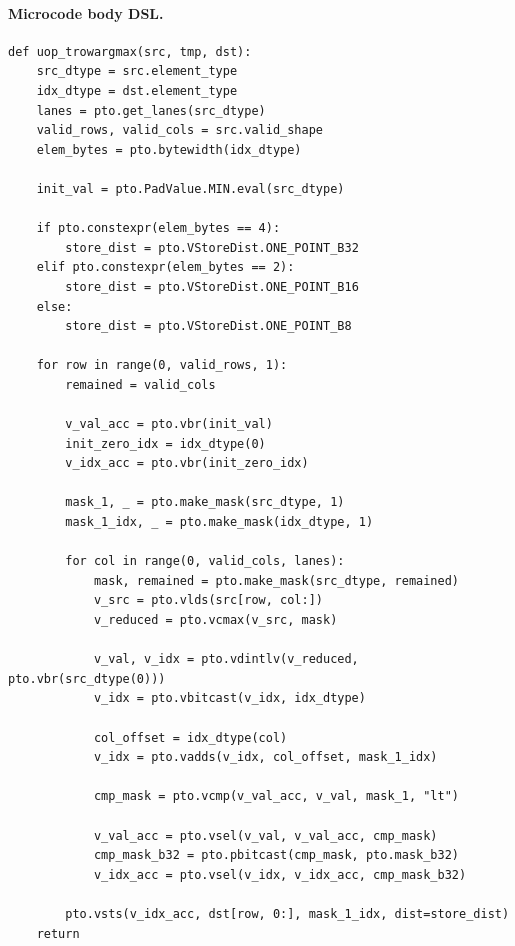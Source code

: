 \paragraph{Microcode body DSL.}
\begin{lstlisting}[style=ptocode]
def uop_trowargmax(src, tmp, dst):
    src_dtype = src.element_type
    idx_dtype = dst.element_type
    lanes = pto.get_lanes(src_dtype)
    valid_rows, valid_cols = src.valid_shape
    elem_bytes = pto.bytewidth(idx_dtype)

    init_val = pto.PadValue.MIN.eval(src_dtype)

    if pto.constexpr(elem_bytes == 4):
        store_dist = pto.VStoreDist.ONE_POINT_B32
    elif pto.constexpr(elem_bytes == 2):
        store_dist = pto.VStoreDist.ONE_POINT_B16
    else:
        store_dist = pto.VStoreDist.ONE_POINT_B8

    for row in range(0, valid_rows, 1):
        remained = valid_cols

        v_val_acc = pto.vbr(init_val)
        init_zero_idx = idx_dtype(0)
        v_idx_acc = pto.vbr(init_zero_idx)

        mask_1, _ = pto.make_mask(src_dtype, 1)
        mask_1_idx, _ = pto.make_mask(idx_dtype, 1)

        for col in range(0, valid_cols, lanes):
            mask, remained = pto.make_mask(src_dtype, remained)
            v_src = pto.vlds(src[row, col:])
            v_reduced = pto.vcmax(v_src, mask)

            v_val, v_idx = pto.vdintlv(v_reduced, pto.vbr(src_dtype(0)))
            v_idx = pto.vbitcast(v_idx, idx_dtype)

            col_offset = idx_dtype(col)
            v_idx = pto.vadds(v_idx, col_offset, mask_1_idx)

            cmp_mask = pto.vcmp(v_val_acc, v_val, mask_1, "lt")

            v_val_acc = pto.vsel(v_val, v_val_acc, cmp_mask)
            cmp_mask_b32 = pto.pbitcast(cmp_mask, pto.mask_b32)
            v_idx_acc = pto.vsel(v_idx, v_idx_acc, cmp_mask_b32)

        pto.vsts(v_idx_acc, dst[row, 0:], mask_1_idx, dist=store_dist)
    return
\end{lstlisting}
\Needspace{0.34\textheight}
